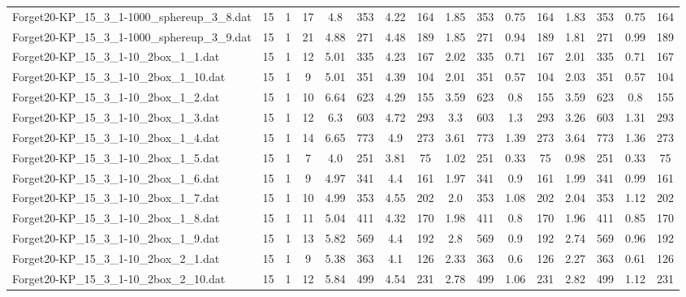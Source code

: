 \begin{sidewaystable}[!ht]
{\begin{tabular}{lccccccccccccccc}
Forget20-KP\_15\_3\_1-1000\_sphereup\_3\_8.dat & 15 & 1 & 17 & 4.8 & 353 & 4.22 & 164 & 1.85 & 353 &  \textcolor{blue2}{0.75} & 164 & 1.83 & 353 &  \textcolor{blue2}{0.75} & 164 \\
Forget20-KP\_15\_3\_1-1000\_sphereup\_3\_9.dat & 15 & 1 & 21 & 4.88 & 271 & 4.48 & 189 & 1.85 & 271 &  \textcolor{blue2}{0.94} & 189 & 1.81 & 271 & 0.99 & 189 \\
Forget20-KP\_15\_3\_1-10\_2box\_1\_1.dat & 15 & 1 & 12 & 5.01 & 335 & 4.23 & 167 & 2.02 & 335 &  \textcolor{blue2}{0.71} & 167 & 2.01 & 335 &  \textcolor{blue2}{0.71} & 167 \\
Forget20-KP\_15\_3\_1-10\_2box\_1\_10.dat & 15 & 1 & 9 & 5.01 & 351 & 4.39 & 104 & 2.01 & 351 & 0.57 & 104 & 2.03 & 351 & 0.57 & 104 \\
Forget20-KP\_15\_3\_1-10\_2box\_1\_2.dat & 15 & 1 & 10 & 6.64 & 623 & 4.29 & 155 & 3.59 & 623 & 0.8 & 155 & 3.59 & 623 & 0.8 & 155 \\
Forget20-KP\_15\_3\_1-10\_2box\_1\_3.dat & 15 & 1 & 12 & 6.3 & 603 & 4.72 & 293 & 3.3 & 603 & 1.3 & 293 & 3.26 & 603 & 1.31 & 293 \\
Forget20-KP\_15\_3\_1-10\_2box\_1\_4.dat & 15 & 1 & 14 & 6.65 & 773 & 4.9 & 273 & 3.61 & 773 & 1.39 & 273 & 3.64 & 773 &  \textcolor{blue2}{1.36} & 273 \\
Forget20-KP\_15\_3\_1-10\_2box\_1\_5.dat & 15 & 1 & 7 & 4.0 & 251 & 3.81 & 75 & 1.02 & 251 &  \textcolor{blue2}{0.33} & 75 & 0.98 & 251 &  \textcolor{blue2}{0.33} & 75 \\
Forget20-KP\_15\_3\_1-10\_2box\_1\_6.dat & 15 & 1 & 9 & 4.97 & 341 & 4.4 & 161 & 1.97 & 341 &  \textcolor{blue2}{0.9} & 161 & 1.99 & 341 & 0.99 & 161 \\
Forget20-KP\_15\_3\_1-10\_2box\_1\_7.dat & 15 & 1 & 10 & 4.99 & 353 & 4.55 & 202 & 2.0 & 353 & 1.08 & 202 & 2.04 & 353 & 1.12 & 202 \\
Forget20-KP\_15\_3\_1-10\_2box\_1\_8.dat & 15 & 1 & 11 & 5.04 & 411 & 4.32 & 170 & 1.98 & 411 & 0.8 & 170 & 1.96 & 411 & 0.85 & 170 \\
Forget20-KP\_15\_3\_1-10\_2box\_1\_9.dat & 15 & 1 & 13 & 5.82 & 569 & 4.4 & 192 & 2.8 & 569 &  \textcolor{blue2}{0.9} & 192 & 2.74 & 569 & 0.96 & 192 \\
Forget20-KP\_15\_3\_1-10\_2box\_2\_1.dat & 15 & 1 & 9 & 5.38 & 363 & 4.1 & 126 & 2.33 & 363 &  \textcolor{blue2}{0.6} & 126 & 2.27 & 363 & 0.61 & 126 \\
Forget20-KP\_15\_3\_1-10\_2box\_2\_10.dat & 15 & 1 & 12 & 5.84 & 499 & 4.54 & 231 & 2.78 & 499 &  \textcolor{blue2}{1.06} & 231 & 2.82 & 499 & 1.12 & 231 \\

\end{tabular}}
\end{sidewaystable}
